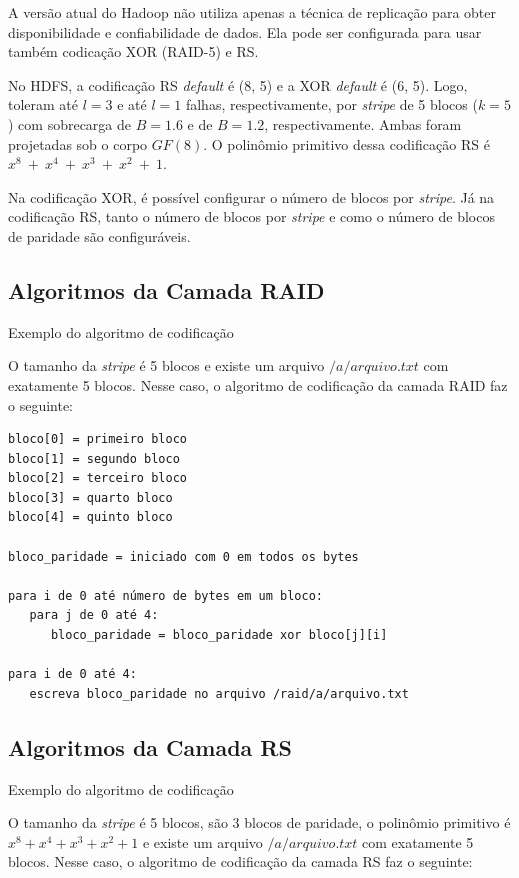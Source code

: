 A versão atual do Hadoop não utiliza apenas a técnica de replicação
\cite{White:2009} para obter disponibilidade e confiabilidade de
dados. Ela pode ser configurada para usar também  codicação XOR (RAID-5) e RS.

No HDFS, a codificação RS \emph{default} é (8, 5) e a XOR \emph{default} é (6, 5).  Logo, toleram até $l=3$ e até $l=1$ falhas, respectivamente, por \emph{stripe} de 5 blocos ($k=5$) com sobrecarga de $B=1.6$ e de $B=1.2$, respectivamente. Ambas foram projetadas sob o corpo $GF(8)$. O polinômio primitivo dessa codificação RS é $x^8\ +\ x^4\ +\ x^3\ +\ x^2\ +\ 1$.

Na codificação XOR, é possível configurar o número de blocos por \emph{stripe}. Já na codificação RS, tanto o número de blocos por \emph{stripe} e como o número de blocos de paridade são configuráveis.

\subsection{Algoritmos da Camada RAID}

Exemplo do algoritmo de codificação

O tamanho da \emph{stripe} é 5 blocos e existe um arquivo $/a/arquivo.txt$ com exatamente 5 blocos. Nesse caso, o algoritmo de codificação da camada RAID faz o seguinte:

\begin{verbatim}
bloco[0] = primeiro bloco
bloco[1] = segundo bloco
bloco[2] = terceiro bloco
bloco[3] = quarto bloco
bloco[4] = quinto bloco

bloco_paridade = iniciado com 0 em todos os bytes

para i de 0 até número de bytes em um bloco:
   para j de 0 até 4:
      bloco_paridade = bloco_paridade xor bloco[j][i]

para i de 0 até 4:
   escreva bloco_paridade no arquivo /raid/a/arquivo.txt
\end{verbatim}

\subsection{Algoritmos da Camada RS}

Exemplo do algoritmo de codificação

O tamanho da \emph{stripe} é 5 blocos, são 3 blocos de paridade, o polinômio primitivo é $x^8 + x^4 + x^3 + x^2 + 1$ e existe um arquivo $/a/arquivo.txt$ com exatamente 5 blocos. Nesse caso, o algoritmo de codificação da camada RS faz o seguinte:

